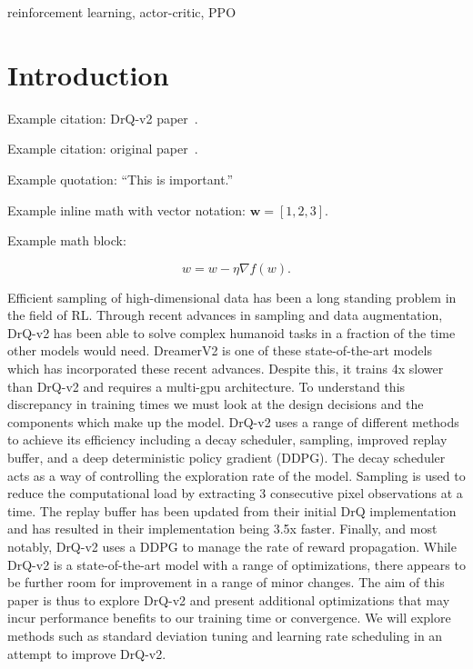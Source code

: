 \documentclass[conference]{./IEEEtran/IEEEtran} %
\begin{document}
    \begin{IEEEkeywords}
        reinforcement learning, actor-critic, PPO
    \end{IEEEkeywords}

    \section{Introduction}\label{sec:introduction}
    Example citation: DrQ-v2 paper~\cite{yarats2021drqv2}.

    Example citation: original paper~\cite{yarats2021image}.

    Example quotation: \enquote{This is important.}

    Example inline math with vector notation: \(\mathbf{w} = [1, 2, 3]\).

    Example math block:

    \[w = w - \eta \nabla f(w).\]

    Efficient sampling of high-dimensional data has been a long standing problem in the field of RL. Through recent advances in 
    sampling and data augmentation, DrQ-v2 has been able to solve complex humanoid tasks in a fraction of the time other models 
    would need. DreamerV2 is one of these state-of-the-art models which has incorporated these recent advances. Despite this, it 
    trains 4x slower than DrQ-v2 and requires a multi-gpu architecture. To understand this discrepancy in training times we must 
    look at the design decisions and the components which make up the model. 
    DrQ-v2 uses a range of different methods to achieve its efficiency including a decay scheduler, sampling, improved replay buffer, 
    and a deep deterministic policy gradient (DDPG). The decay scheduler acts as a way of controlling the exploration rate of the model. 
    Sampling is used to reduce the computational load by extracting 3 consecutive pixel observations at a time. The replay buffer has 
    been updated from their initial DrQ implementation and has resulted in their implementation being 3.5x faster. Finally, and most 
    notably, DrQ-v2 uses a DDPG to manage the rate of reward propagation. 
    While DrQ-v2 is a state-of-the-art model with a range of optimizations, there appears to be further room for improvement in a range 
    of minor changes. The aim of this paper is thus to explore DrQ-v2 and present additional optimizations that may incur performance 
    benefits to our training time or convergence. We will explore methods such as standard deviation tuning and learning rate scheduling 
    in an attempt to improve DrQ-v2.
\end{document}
